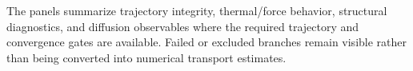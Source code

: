 The panels summarize trajectory integrity, thermal/force behavior, structural diagnostics, and diffusion observables where the required trajectory and convergence gates are available. Failed or excluded branches remain visible rather than being converted into numerical transport estimates.
